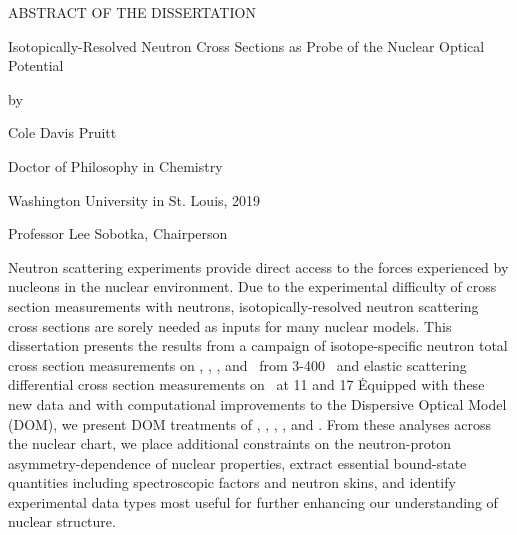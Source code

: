 \thispagestyle{plain}
\begin{center}

    ABSTRACT OF THE DISSERTATION

    Isotopically-Resolved Neutron Cross Sections as
    Probe of the Nuclear Optical Potential

    \vspace{0.5 cm}

    by

    \vspace{0.2 cm}

    Cole Davis Pruitt

    \vspace{0.2 cm}

    Doctor of Philosophy in Chemistry

    \vspace{0.2 cm}

    Washington University in St. Louis, 2019

    \vspace{0.2cm}

    Professor Lee Sobotka, Chairperson
\end{center}

\vspace{1cm}

Neutron scattering experiments provide direct access to the forces experienced by nucleons in the
nuclear environment. Due to the experimental difficulty of cross section
measurements with neutrons, isotopically-resolved neutron scattering cross sections are sorely
needed as inputs for many nuclear models.
This dissertation presents the results from a campaign of
isotope-specific neutron total cross section measurements on \oSixEight, \niEightFour,
\snTwelveFour, and \rhThree\ from
3-400 \mega\electronvolt\, and elastic scattering differential cross section measurements on
\snTwelveNatFour\ at 11 and 17 \mega\electronvolt\. Equipped with these new data and
with computational improvements to the Dispersive Optical Model (DOM),
we present DOM treatments of \oSixEight, \caAughtEight, \niEightFour, 
\snTwelveFour, and \pbEight. From these analyses across the nuclear chart, we place additional 
constraints on the neutron-proton asymmetry-dependence of nuclear properties, extract essential bound-state 
quantities including spectroscopic factors and neutron skins, and identify experimental data types
most useful for further enhancing our understanding of nuclear structure.

